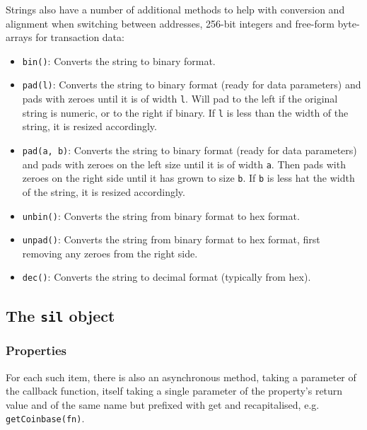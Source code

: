 Strings also have a number of additional methods to help with conversion and alignment when switching between addresses, 256-bit integers and free-form byte-arrays for transaction data:

\begin{itemize}
\item \texttt{bin()}: Converts the string to binary format.
\item \texttt{pad(l)}: Converts the string to binary format (ready for data parameters) and pads with zeroes until it is of width \texttt{l}. Will pad to the left if the original string is numeric, or to the right if binary. If \texttt{l} is less than the width of the string, it is resized accordingly.
\item \texttt{pad(a, b)}: Converts the string to binary format (ready for data parameters) and pads with zeroes on the left size until it is of width \texttt{a}. Then pads with zeroes on the right side until it has grown to size \texttt{b}. If \texttt{b} is less hat the width of the string, it is resized accordingly.
\item \texttt{unbin()}: Converts the string from binary format to hex format.
\item \texttt{unpad()}: Converts the string from binary format to hex format, first removing any zeroes from the right side.
\item \texttt{dec()}: Converts the string to decimal format (typically from hex).
\end{itemize}

\subsection{The \texttt{sil} object}

\subsubsection{Properties}

For each such item, there is also an asynchronous method, taking a parameter of the callback function, itself taking a single parameter of the property's return value and of the same name but prefixed with get and recapitalised, e.g. \texttt{getCoinbase(fn)}.

